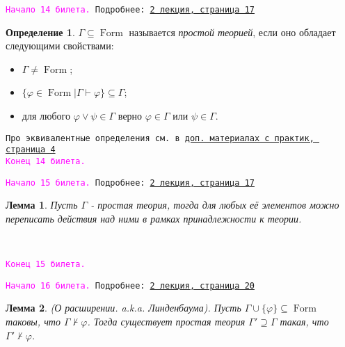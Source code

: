 \documentclass[a4paper,100pt]{article}
\theoremstyle{indented}
\newtheorem{lemma}{Лемма}
\theoremstyle{definition}
\newtheorem{defn}{Определение}
\theoremstyle{remark}
\DeclareMathOperator{\form}{Form}
\begin{document}
\texttt{\hypertarget{b14}{\textcolor{magenta}{Начало 14 билета.}} Подробнее: \href{http://www.mi-ras.ru/~speranski/courses/logic-1-2021-spring/slides_2.pdf}{2 лекция, страница 17}} 

\begin{defn}
  $\Gamma \subseteq \form$ называется \textit{простой теорией}, если оно обладает следующими свойствами:

  \begin{itemize}
    \item $\Gamma \neq \form$; 
    \item $\{\varphi \in \form |\Gamma \vdash \varphi\}\subseteq \Gamma$; 
    \item для любого $\varphi \vee \psi \in \Gamma$ верно $\varphi \in \Gamma$ или $\psi \in \Gamma$. 
  \end{itemize}
\end{defn}

\texttt{Про эквивалентные определения см. в \href{http://www.mi-ras.ru/~speranski/courses/logic-1-2021-spring/slides-more_pcl.pdf}{доп. материалах с практик, страница 4}} \\ 

\texttt{\textcolor{magenta}{Конец 14 билета.}} 

\hrulefill

\texttt{\hypertarget{b15}{\textcolor{magenta}{Начало 15 билета.}} Подробнее: \href{http://www.mi-ras.ru/~speranski/courses/logic-1-2021-spring/slides_2.pdf}{2 лекция, страница 17}} \\

\begin{lemma}
  Пусть $\Gamma$ - простая теория, тогда для любых её элементов можно переписать действия над ними в рамках принадлежности к теории.
\end{lemma}\

\texttt{\textcolor{magenta}{Конец 15 билета.}} 

\hrulefill

\texttt{\hypertarget{b16}{\textcolor{magenta}{Начало 16 билета.}} Подробнее: \href{http://www.mi-ras.ru/~speranski/courses/logic-1-2021-spring/slides_2.pdf}{2 лекция, страница 20}} \\

\begin{lemma}
  (О расширении. a.k.a. Линденбаума). Пусть $\Gamma \cup \{\varphi \}\subseteq \form$ таковы, что $\Gamma \nvdash \varphi$. Тогда существует простая теория $\Gamma'\supseteq \Gamma$ такая, что $\Gamma' \nvdash \varphi$.
\end{lemma}
\end{document}

